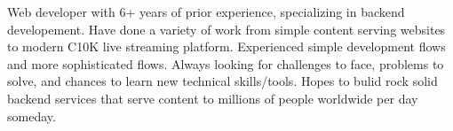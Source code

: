 

\begin{cvparagraph}

Web developer with 6+ years of prior experience, specializing in backend developement. Have done a variety of work from simple content serving websites to modern C10K live streaming platform. Experienced simple development flows and more sophisticated flows. Always looking for challenges to face, problems to solve, and chances to learn new technical skills/tools. Hopes to bulid rock solid backend services that serve content to millions of people worldwide per day someday.
\end{cvparagraph}
